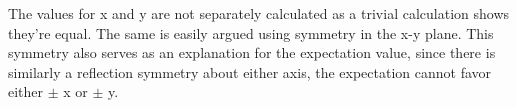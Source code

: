 The values for x and y are not separately calculated as a trivial calculation shows they're equal. The 
same is easily argued using symmetry in the x-y plane. This symmetry also serves as an explanation for the
expectation value, since there is similarly a reflection symmetry about either axis, the expectation cannot
favor either $\pm$ x or $\pm$ y.
